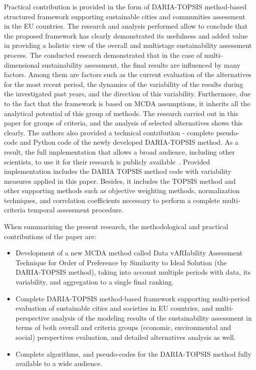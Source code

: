 \documentclass[final,5p,times,twocolumn,authoryear]{elsarticle}
\begin{document}
Practical contribution is provided in the form of DARIA-TOPSIS method-based structured framework supporting sustainable cities and communities assessment in the EU countries. The research and analysis performed allow to conclude that the proposed framework has clearly demonstrated its usefulness and added value in providing a holistic view of the overall and multistage sustainability assessment process. The conducted research demonstrated that in the case of multi-dimensional sustainability assessment, the final results are influenced by many factors. Among them are factors such as the current evaluation of the alternatives for the most recent period, the dynamics of the variability of the results during the investigated past years, and the direction of this variability. Furthermore, due to the fact that the framework is based on MCDA assumptions, it inherits all the analytical potential of this group of methods. The research carried out in this paper for groups of criteria, and the analysis of selected alternatives shows this clearly. The authors also provided a technical contribution - complete pseudo-code and Python code of the newly developed DARIA-TOPSIS method. As a result, the full implementation that allows a broad audience, including other scientists, to use it for their research is publicly available~\citep{dariagithub2022}. Provided implementation includes the DARIA TOPSIS method code with variability measures applied in this paper. Besides, it includes the TOPSIS method and other supporting methods such as objective weighting methods, normalization techniques, and correlation coefficients necessary to perform a complete multi-criteria temporal assessment procedure.    

When summarizing the present research, the methodological and practical contributions of the paper are: 

\begin{itemize}
    \item {Development of a new MCDA method called Data vARIability Assessment Technique for Order of Preference by Similarity to Ideal Solution (the DARIA-TOPSIS method), taking into account multiple periods with data, its variability, and aggregation to a single final ranking.}
    \item {Complete DARIA-TOPSIS method-based framework supporting multi-period evaluation of sustainable cities and societies in EU countries, and multi-perspective analysis of the modeling results of the sustainability assessment in terms of both overall and criteria groups (economic, environmental and social) perspectives evaluation, and detailed alternatives analysis as well.}
    \item {Complete algorithms, and pseudo-codes for the DARIA-TOPSIS method fully available to a wide audience.}
\end{itemize}
\end{document}
